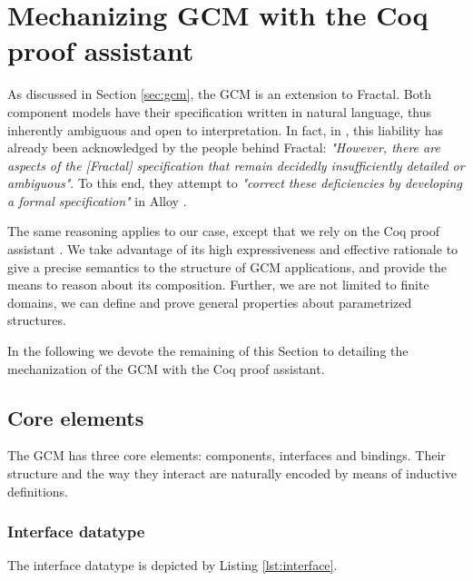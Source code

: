 \section{Mechanizing GCM with the Coq proof assistant}
\label{sec:coqgcm}
		
	
		As discussed in Section \ref{sec:gcm}, the \ac{GCM} is an extension to 
		Fractal. Both component models have their specification written in natural language, 
	thus inherently ambiguous and open to interpretation. In fact, in \cite{MERLE:2008:INRIA-00338987:1}, 
	this liability has already been acknowledged by the people behind Fractal: \textit{"However, there are 
	aspects of the [Fractal] specification that remain decidedly insufficiently detailed or ambiguous"}. To this end,
	they attempt to \textit{"correct these deficiencies by developing a formal specification"} in 
	Alloy \cite{Jackson:2002:ALO:505145.505149}. 
	
		The same reasoning applies to our case, except that we rely on the Coq proof assistant \cite{09thecoq}.
	We take advantage of its high expressiveness and effective rationale to give a 
	precise semantics to the structure of \ac{GCM} applications, and provide the means to reason about its
	composition. Further, we are not limited to finite domains, we can define and 
	prove general properties about parametrized structures. 
			
		In the following we devote the remaining of this Section	 to detailing the mechanization
	of the \ac{GCM} with the Coq proof assistant.	
						
		
\subsection{Core elements}
\label{sub:core}

			The \ac{GCM} has three core elements: 
		components, interfaces and bindings. Their structure and the way they interact
		are naturally encoded by means of inductive definitions.
		
\subsubsection{Interface datatype}		
		
		
		The \textsf{interface} datatype is depicted by Listing \ref{lst:interface}.

	


